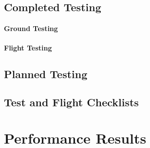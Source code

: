 \documentclass[report]{byu-aero}
\begin{document}
\subsection{Completed Testing}
\label{ssec:completedtesting}




\paragraph{Ground Testing}
\label{sssec:groundtesting}



\paragraph{Flight Testing}
\label{sssec:flighttesting}



\subsection{Planned Testing}
\label{ssec:plannedtesting}



\subsection{Test and Flight Checklists}



\section{Performance Results} %
\label{sec:PerformanceResults}






{}

\end{document}
